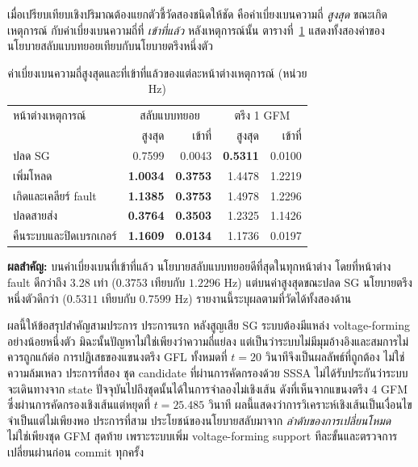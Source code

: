 \documentclass[12pt,a4paper]{article}
\newcommand{\tableheader}{\rowcolor{tablehead}}
\newcommand{\resultbox}[1]{\par\noindent\colorbox{academicgray}{\parbox{\dimexpr\textwidth-2\fboxsep\relax}{\textbf{ผลสำคัญ:} #1}}\par}
\begin{document}
เมื่อเปรียบเทียบเชิงปริมาณต้องแยกตัวชี้วัดสองชนิดให้ชัด คือค่าเบี่ยงเบนความถี่ \emph{สูงสุด} ขณะเกิดเหตุการณ์ กับค่าเบี่ยงเบนความถี่ที่ \emph{เข้าที่แล้ว} หลังเหตุการณ์นั้น ตารางที่~\ref{tab:df} แสดงทั้งสองค่าของนโยบายสลับแบบทยอยเทียบกับนโยบายตรึงหนึ่งตัว
\begin{table}[H]
\centering
\caption{ค่าเบี่ยงเบนความถี่สูงสุดและที่เข้าที่แล้วของแต่ละหน้าต่างเหตุการณ์ (หน่วย Hz)}
\label{tab:df}
\begin{tabularx}{0.99\textwidth}{@{}X r r r r@{}}
\toprule
\tableheader หน้าต่างเหตุการณ์ & \multicolumn{2}{c}{สลับแบบทยอย} & \multicolumn{2}{c}{ตรึง 1 GFM} \\
\tableheader & สูงสุด & เข้าที่ & สูงสุด & เข้าที่ \\
\midrule
ปลด SG & 0.7599 & 0.0043 & \textbf{0.5311} & 0.0100 \\
เพิ่มโหลด & \textbf{1.0034} & \textbf{0.3753} & 1.4478 & 1.2219 \\
เกิดและเคลียร์ fault & \textbf{1.1385} & \textbf{0.3753} & 1.4978 & 1.2296 \\
ปลดสายส่ง & \textbf{0.3764} & \textbf{0.3503} & 1.2325 & 1.1426 \\
คืนระบบและปิดเบรกเกอร์ & \textbf{1.1609} & \textbf{0.0134} & 1.1736 & 0.0197 \\
\bottomrule
\end{tabularx}
\end{table}
\resultbox{บนค่าเบี่ยงเบนที่เข้าที่แล้ว นโยบายสลับแบบทยอยดีที่สุดในทุกหน้าต่าง โดยที่หน้าต่าง fault ดีกว่าถึง 3.28 เท่า ($0.3753$ เทียบกับ $1.2296$ Hz) แต่บนค่าสูงสุดขณะปลด SG นโยบายตรึงหนึ่งตัวดีกว่า ($0.5311$ เทียบกับ $0.7599$ Hz) รายงานนี้ระบุผลตามที่วัดได้ทั้งสองด้าน}

ผลนี้ให้ข้อสรุปสำคัญสามประการ ประการแรก หลังสูญเสีย SG ระบบต้องมีแหล่ง voltage-forming อย่างน้อยหนึ่งตัว มิฉะนั้นปัญหาไม่ใช่เพียงว่าความถี่แย่ลง แต่เป็นว่าระบบไม่มีมุมอ้างอิงและสมการไม่ควรถูกแก้ต่อ การปฏิเสธของแขนงตรึง GFL ทั้งหมดที่ $t=20$ วินาทีจึงเป็นผลลัพธ์ที่ถูกต้อง ไม่ใช่ความล้มเหลว ประการที่สอง ชุด candidate ที่ผ่านการคัดกรองด้วย SSSA ไม่ได้รับประกันว่าระบบจะเดินทางจาก state ปัจจุบันไปถึงชุดนั้นได้ในการจำลองไม่เชิงเส้น ดังที่เห็นจากแขนงตรึง 4 GFM ซึ่งผ่านการคัดกรองเชิงเส้นแต่หยุดที่ $t=25.485$ วินาที ผลนี้แสดงว่าการวิเคราะห์เชิงเส้นเป็นเงื่อนไขจำเป็นแต่ไม่เพียงพอ ประการที่สาม ประโยชน์ของนโยบายสลับมาจาก \emph{ลำดับของการเปลี่ยนโหมด} ไม่ใช่เพียงชุด GFM สุดท้าย เพราะระบบเพิ่ม voltage-forming support ทีละขั้นและตรวจการเปลี่ยนผ่านก่อน commit ทุกครั้ง
\end{document}

